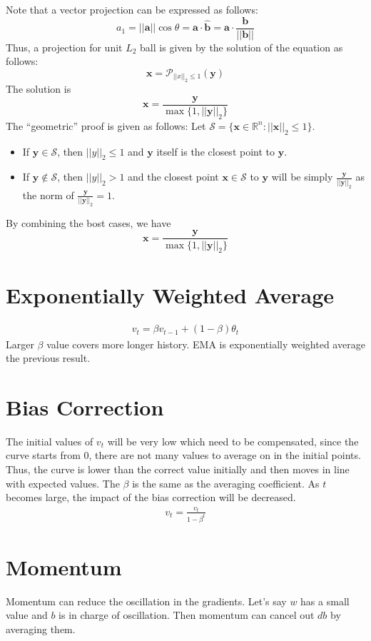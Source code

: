 Note that a vector projection can be expressed as follows:
$$a_1 = ||\mathbf{a}||\cos \theta = \mathbf{a}\cdot \hat{\mathbf{b}} = \mathbf{a}\cdot \frac{\mathbf{b}}{||\mathbf{b}||}$$
Thus, a projection for unit $L_2$ ball is given by the solution of the equation as follows:
$$\mathbf{x} = \mathcal{P}_{||x||_2\leq 1}(\mathbf{y})$$
The solution is
$$\mathbf{x} = \frac{\mathbf{y}}{\max \{1,||\mathbf{y}||_2\}}$$
The ``geometric'' proof is given as follows: Let $\mathcal{S} = \{\mathbf{x}\in \mathbb{R}^n: ||\mathbf{x}||_2 \leq 1\}.$
\begin{itemize}
		\item If $\mathbf{y}\in \mathcal{S}$, then $||y||_2\leq 1$ and $\mathbf{y}$ itself is the closest point to $\mathbf{y}$.
		\item If $\mathbf{y}\notin \mathcal{S}$, then $||y||_2> 1$ and the closest point $\mathbf{x}\in \mathcal{S}$ to $\mathbf{y}$ will be simply $\frac{\mathbf{y}}{||\mathbf{y}||_2}$ as the norm of $\frac{\mathbf{y}}{||\mathbf{y}||_2}=1$.
\end{itemize}
By combining the bost cases, we have
$$\mathbf{x} = \frac{\mathbf{y}}{\max \{1,||\mathbf{y}||_2\}}$$


\section{Exponentially Weighted Average}
\begin{align*}
    v_t = \beta v_{t-1} + (1-\beta) \theta_t
\end{align*}
Larger $\beta$ value covers more longer history. EMA is exponentially weighted average the previous result. 

\section{Bias Correction}
The initial values of $v_t$ will be very low which need to be compensated, since the curve starts from 0, there are not many values to average on in the initial points. Thus, the curve is lower than the correct value initially and then moves in line with expected values. The $\beta$ is the same as the averaging coefficient. As $t$ becomes large, the impact of the bias correction will be decreased. 
\begin{align*}
    v_t = \frac{v_t}{1-\beta^t}
\end{align*}


\section{Momentum}
Momentum can reduce the oscillation in the gradients. Let's say $w$ has a small value and $b$ is in charge of oscillation. Then momentum can cancel out $db$ by averaging them. 

